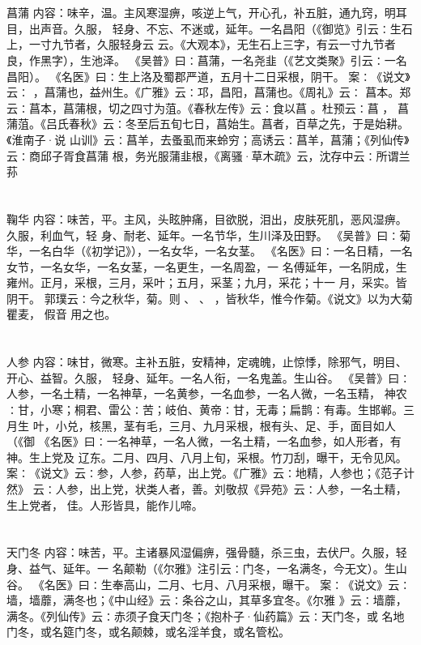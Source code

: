 \documentclass[12pt,UTF8]{ctexbook}
\begin{document}
\chapter{}菖蒲
内容：味辛，温。主风寒湿痹，咳逆上气，开心孔，补五脏，通九窍，明耳目，出声音。久服， 
轻身、不忘、不迷或，延年。一名昌阳（《御览》引云∶生石上，一寸九节者，久服轻身云 
云。《大观本》，无生石上三字，有云一寸九节者良，作黑字），生池泽。 
《吴普》曰∶菖蒲，一名尧韭（《艺文类聚》引云∶一名昌阳）。 
《名医》曰∶生上洛及蜀郡严道，五月十二日采根，阴干。 
案∶《说文》云∶ ，菖蒲也，益州生。《广雅》云∶邛，昌阳，菖蒲也。《周礼》云∶ 
菖本。郑云∶菖本，菖蒲根，切之四寸为菹。《春秋左传》云∶食以菖 。杜预云∶菖 ， 
菖蒲菹。《吕氏春秋》云∶冬至后五旬七日，菖始生。菖者，百草之先，于是始耕。《淮南子·说 
山训》云∶菖羊，去蚤虱而来蛉穷；高诱云∶菖羊，菖蒲；《列仙传》云∶商邱子胥食菖蒲 
根，务光服蒲韭根，《离骚·草木疏》云，沈存中云∶所谓兰荪 


\chapter{}鞠华
内容：味苦，平。主风，头眩肿痛，目欲脱，泪出，皮肤死肌，恶风湿痹。久服，利血气，轻 
身、耐老、延年。一名节华，生川泽及田野。 
《吴普》曰∶菊华，一名白华（《初学记》），一名女华，一名女茎。 
《名医》曰∶一名日精，一名女节，一名女华，一名女茎，一名更生，一名周盈，一 
名傅延年，一名阴成，生雍州。正月，采根，三月，采叶；五月，采茎；九月，采花；十一 
月，采实。皆阴干。 
郭璞云∶今之秋华，菊。则 、 、 ，皆秋华，惟今作菊。《说文》以为大菊瞿麦， 
假音 
用之也。 


\chapter{}人参
内容：味甘，微寒。主补五脏，安精神，定魂魄，止惊悸，除邪气，明目、开心、益智。久服， 
轻身、延年。一名人衔，一名鬼盖。生山谷。 
《吴普》曰∶人参，一名土精，一名神草，一名黄参，一名血参，一名人微，一名玉精， 
神农∶甘，小寒；桐君、雷公∶苦；岐伯、黄帝∶甘，无毒；扁鹊∶有毒。生邯郸。三月生 
叶，小兑，核黑，茎有毛，三月、九月采根，根有头、足、手，面目如人（《御 
《名医》曰∶一名神草，一名人微，一名土精，一名血参，如人形者，有神。生上党及 
辽东。二月、四月、八月上旬，采根。竹刀刮，曝干，无令见风。 
案∶《说文》云∶参，人参，药草，出上党。《广雅》云∶地精，人参也；《范子计然》 
云∶人参，出上党，状类人者，善。刘敬叔《异苑》云∶人参，一名土精，生上党者， 
佳。人形皆具，能作儿啼。 


\chapter{}天门冬
内容：味苦，平。主诸暴风湿偏痹，强骨髓，杀三虫，去伏尸。久服，轻身、益气、延年。一 
名颠勒（《尔雅》注引云∶门冬，一名满冬，今无文）。生山谷。 
《名医》曰∶生奉高山，二月、七月、八月采根，曝干。 
案∶《说文》云∶墙，墙蘼，满冬也；《中山经》云∶条谷之山，其草多宜冬。《尔雅 
》云∶墙蘼，满冬。《列仙传》云∶赤须子食天门冬；《抱朴子·仙药篇》云∶天门冬，或 
名地门冬，或名筵门冬，或名颠棘，或名淫羊食，或名管松。 
\end{document}
